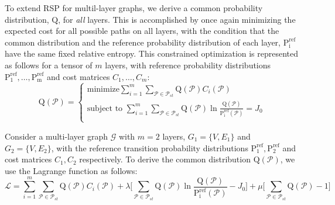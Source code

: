 To extend RSP for multil-layer graphs, we derive a common probability distribution, $\mathrm{Q}$, for \emph{all} layers. This is accomplished by once again minimizing the expected cost for all possible paths on all layers, with the condition that the common distribution and the reference probability distribution of each layer, $\mathrm{P_i^{ref}}$ have the same fixed relative entropy. This constrained optimization is represented as follows for a tensor of $m$ layers, with reference probability distributions $\mathrm{P_1^{ref}}, \ldots , \mathrm{P_m^{ref}}$ and cost matrices $C_1 , \ldots , C_m $:
\begin{equation}
    \mathrm{Q}(\mathcal{P})=\left\{
                \begin{array}{ll}
                  \text{minimize} \sum\limits_{i=1}^{m} \sum\limits_{\mathcal{P} \in \mathcal{P}_{st}} \mathrm{Q}(\mathcal{P})C_i(\mathcal{P}) \\
                  \text{subject to } \sum\limits_{i=1}^{m} \sum\limits_{\mathcal{P} \in \mathcal{P}_{st}} \mathrm{Q}(\mathcal{P}) \ln \frac{\mathrm{Q}(\mathcal{P}) } { \mathrm{P_i^{ref}}(\mathcal{P})} = J_0\\

                \end{array}
              \right.
\end{equation}

Consider a multi-layer graph $\mathcal{G}$ with $m=2$ layers, $G_1 = \{V, E_1\}$ and $G_2 = \{V,E_2\}$, with the reference transition probability distributions  $\mathrm{P_1^{ref}},  \mathrm{P_2^{ref}}$ and cost matrices $C_1, C_2$ respectively. To derive the common distribution $\mathrm{Q}(\mathcal{P})$, we use the Lagrange function as follows:
\begin{equation}
\mathcal{L} = \sum\limits_{i=1}^{m} \sum\limits_{\mathcal{P} \in \mathcal{P}_{st}} \mathrm{Q}(\mathcal{P})C_i(\mathcal{P})  + \lambda \Bigg\lbrack\sum\limits_{\mathcal{P} \in \mathcal{P}_{st}} \mathrm{Q}(\mathcal{P}) \ln \frac{\mathrm{Q}(\mathcal{P}) } { \mathrm{P_i^{ref}}(\mathcal{P})} - J_0 \Bigg\rbrack + \mu\Bigg\lbrack \sum\limits_{\mathcal{P} \in \mathcal{P}_{st}} \mathrm{Q}(\mathcal{P}) - 1 \Bigg\rbrack
\end{equation}

